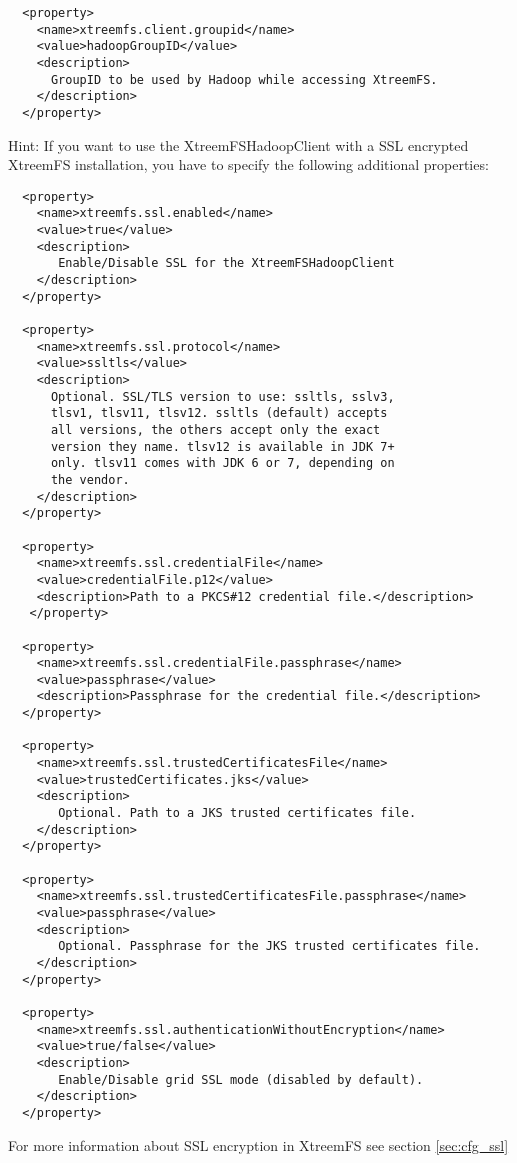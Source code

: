 \documentclass[a4paper,10pt]{book}
\begin{document}
\begin{enumerate}
\begin{enumerate}
\begin{verbatim}
  <property>
    <name>xtreemfs.client.groupid</name>
    <value>hadoopGroupID</value>
    <description>
      GroupID to be used by Hadoop while accessing XtreemFS.
    </description>
  </property>
	\end{verbatim}

		Hint: If you want to use the XtreemFSHadoopClient with a SSL encrypted XtreemFS installation, you have to specify the following additional properties:
	\begin{verbatim}
  <property>
    <name>xtreemfs.ssl.enabled</name>
    <value>true</value>
    <description>
       Enable/Disable SSL for the XtreemFSHadoopClient
    </description>
  </property>

  <property>
    <name>xtreemfs.ssl.protocol</name>
    <value>ssltls</value>
    <description>
      Optional. SSL/TLS version to use: ssltls, sslv3,
      tlsv1, tlsv11, tlsv12. ssltls (default) accepts
      all versions, the others accept only the exact
      version they name. tlsv12 is available in JDK 7+
      only. tlsv11 comes with JDK 6 or 7, depending on
      the vendor.
    </description>
  </property>

  <property>
    <name>xtreemfs.ssl.credentialFile</name>
    <value>credentialFile.p12</value>
    <description>Path to a PKCS#12 credential file.</description>
   </property>

  <property>
    <name>xtreemfs.ssl.credentialFile.passphrase</name>
    <value>passphrase</value>
    <description>Passphrase for the credential file.</description>
  </property>

  <property>
    <name>xtreemfs.ssl.trustedCertificatesFile</name>
    <value>trustedCertificates.jks</value>
    <description>
       Optional. Path to a JKS trusted certificates file.
    </description>
  </property>

  <property>
    <name>xtreemfs.ssl.trustedCertificatesFile.passphrase</name>
    <value>passphrase</value>
    <description>
       Optional. Passphrase for the JKS trusted certificates file.
    </description>
  </property>

  <property>
    <name>xtreemfs.ssl.authenticationWithoutEncryption</name>
    <value>true/false</value>
    <description>
       Enable/Disable grid SSL mode (disabled by default).
    </description>
  </property>
	\end{verbatim}

  For more information about SSL encryption in XtreemFS see section \ref{sec:cfg_ssl}


\end{enumerate}
\end{enumerate}
\end{document}
